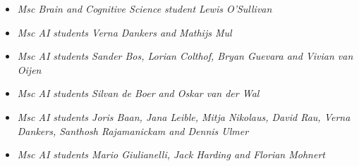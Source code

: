 {{{{{{{{{
{\begin{itemize}
  \item[] \textit{Msc Brain and Cognitive Science student Lewis O'Sullivan}
\end{itemize}}}

{
{\begin{itemize}
  \item[] \textit{Msc AI students Verna Dankers and Mathijs Mul}
\end{itemize}}}

{
{\begin{itemize}
  \item[] \textit{Msc AI students Sander Bos, Lorian Colthof, Bryan Guevara and Vivian van Oijen}
\end{itemize}}}

{
{\begin{itemize}
  \item[] \textit{Msc AI students Silvan de Boer and Oskar van der Wal}
\end{itemize}}}

{
{\begin{itemize}
  \item[] \textit{Msc AI students Joris Baan, Jana Leible, Mitja Nikolaus, David Rau, Verna Dankers, Santhosh Rajamanickam and Dennis Ulmer}
\end{itemize}}}

{
{\begin{itemize}
  \item[] \textit{Msc AI students Mario Giulianelli, Jack Harding and Florian Mohnert}
\end{itemize}}}

}}}}}}}}

